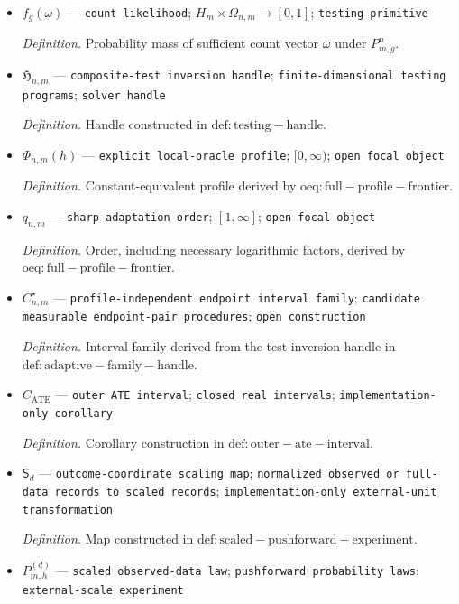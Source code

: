 \documentclass{article}
\begin{document}
\begin{itemize}
  \item \(f_g(\omega)\) --- \texttt{count likelihood}; \(H_m\times\Omega_{n,m}\to[0,1]\); \texttt{testing primitive}
  \par\smallskip\noindent\emph{Definition.} Probability mass of sufficient count vector \(\omega\) under \(P_{m,g}^{n}\).
  \item \(\mathfrak H_{n,m}\) --- \texttt{composite-\allowbreak{}test inversion handle}; \texttt{finite-\allowbreak{}dimensional testing programs}; \texttt{solver handle}
  \par\smallskip\noindent\emph{Definition.} Handle constructed in \(\mathrm{def:testing-handle}\).
  \item \(\Phi_{n,m}(h)\) --- \texttt{explicit local-\allowbreak{}oracle profile}; \([0,\infty)\); \texttt{open focal object}
  \par\smallskip\noindent\emph{Definition.} Constant-equivalent profile derived by \(\mathrm{oeq:full-profile-frontier}\).
  \item \(q_{n,m}\) --- \texttt{sharp adaptation order}; \([1,\infty]\); \texttt{open focal object}
  \par\smallskip\noindent\emph{Definition.} Order, including necessary logarithmic factors, derived by \(\mathrm{oeq:full-profile-frontier}\).
  \item \(C_{n,m}^{\star}\) --- \texttt{profile-\allowbreak{}independent endpoint interval family}; \texttt{candidate measurable endpoint-\allowbreak{}pair procedures}; \texttt{open construction}
  \par\smallskip\noindent\emph{Definition.} Interval family derived from the test-inversion handle in \(\mathrm{def:adaptive-family-handle}\).
  \item \(C_{\mathrm{ATE}}\) --- \texttt{outer ATE interval}; \texttt{closed real intervals}; \texttt{implementation-\allowbreak{}only corollary}
  \par\smallskip\noindent\emph{Definition.} Corollary construction in \(\mathrm{def:outer-ate-interval}\).
  \item \(\mathsf S_d\) --- \texttt{outcome-\allowbreak{}coordinate scaling map}; \texttt{normalized observed or full-\allowbreak{}data records to scaled records}; \texttt{implementation-\allowbreak{}only external-\allowbreak{}unit transformation}
  \par\smallskip\noindent\emph{Definition.} Map constructed in \(\mathrm{def:scaled-pushforward-experiment}\).
  \item \(P^{(d)}_{m,h}\) --- \texttt{scaled observed-\allowbreak{}data law}; \texttt{pushforward probability laws}; \texttt{external-\allowbreak{}scale experiment}

\end{itemize}
\end{document}

